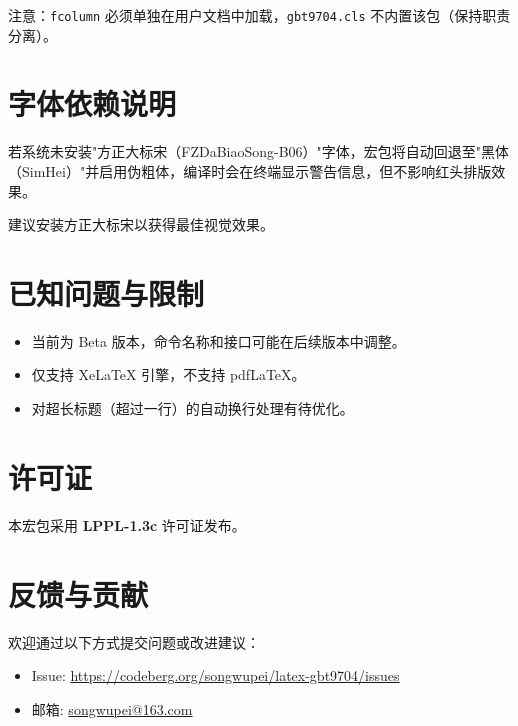 \documentclass[redline, titleindent, zhlineskip]{gbt9704}
\begin{document}
注意：\texttt{fcolumn} 必须单独在用户文档中加载，\texttt{gbt9704.cls} 不内置该包（保持职责分离）。

\section{字体依赖说明}
若系统未安装"方正大标宋（FZDaBiaoSong-B06）"字体，宏包将自动回退至"黑体（SimHei）"并启用伪粗体，编译时会在终端显示警告信息，但不影响红头排版效果。

建议安装方正大标宋以获得最佳视觉效果。

\section{已知问题与限制}
\begin{itemize}
  \item 当前为 Beta 版本，命令名称和接口可能在后续版本中调整。
  \item 仅支持 XeLaTeX 引擎，不支持 pdfLaTeX。
  \item 对超长标题（超过一行）的自动换行处理有待优化。
\end{itemize}

\section{许可证}
本宏包采用 \textbf{LPPL-1.3c} 许可证发布。

\section{反馈与贡献}
欢迎通过以下方式提交问题或改进建议：
\begin{itemize}
  \item Issue: \url{https://codeberg.org/songwupei/latex-gbt9704/issues}
  \item 邮箱: \url{songwupei@163.com}
\end{itemize}
\end{document}
